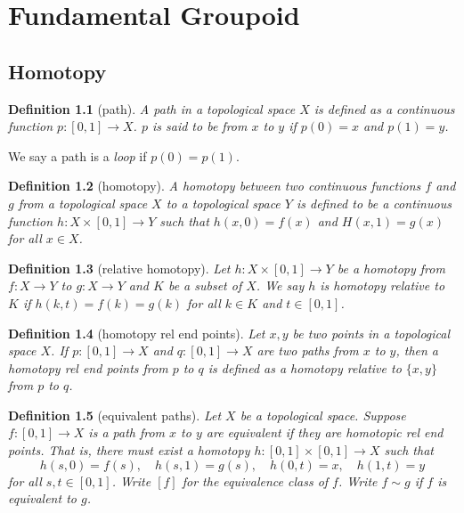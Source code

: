 \documentclass{report}
\newtheorem{definition}{Definition}[section]
\theoremstyle{nonumberplain}
\begin{document}
\chapter{Fundamental Groupoid}
\section{Homotopy}
\begin{definition}[path]	
	A \emph{path} in a topological space $X$ is defined as a continuous function $p:[0,1]\to X$. $p$ is said to be from $x$ to $y$ if $p(0)=x$ and $p(1)=y$.
\end{definition}
We say a path is a \emph{loop} if $p(0)=p(1)$.

\begin{definition}[homotopy]
	A \emph{homotopy} between two continuous functions $f$ and $g$ from a topological space $X$ to a topological space $Y$ is defined to be a continuous function $h: X \times[0,1] \rightarrow Y$ such that $h(x, 0)=f(x)$ and $H(x, 1)=g(x)$ for all $x \in X$.
\end{definition}
\begin{definition}[relative homotopy]
	Let $h: X \times[0,1] \rightarrow Y$ be a homotopy from $f:X\to Y$ to $g:X\to Y$ and $K$ be a subset of $X$. We say $h$ is \emph{homotopy relative to $K$} if $h(k, t)=f(k)=g(k)$ for all $k \in K$ and $t \in[0,1]$. 
\end{definition}
\begin{definition}[homotopy rel end points]
	Let $x,y$ be two points in a topological space $X$. If $p:[0,1]\to X$ and $q:[0,1]\to X$ are two paths from $x$ to $y$, then a \emph{homotopy rel end points from $p$ to $q$} is defined as a homotopy relative to $\{x, y\}$ from $p$ to $q$.
\end{definition}
\begin{definition}[equivalent paths]
	Let $X$ be a topological space. Suppose $f: [0,1] \longrightarrow X$ is a path from $x$ to $y$ are \emph{equivalent} if they are homotopic rel end points. That is, there must exist a homotopy $h: [0,1] \times [0,1] \longrightarrow X$ such that
	$$
	h(s, 0)=f(s), \quad h(s, 1)=g(s), \quad h(0, t)=x, \quad h(1, t)=y
	$$
	for all $s,t \in [0,1]$. Write $[f]$ for the equivalence class of $f$. Write $f\sim g$ if $f$ is equivalent to $g$.
\end{definition}
\end{document}
